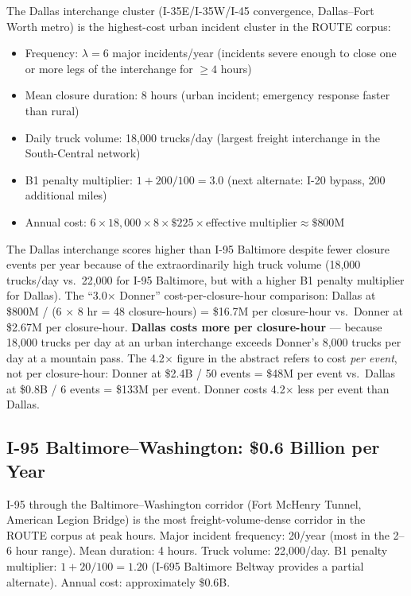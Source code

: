 The Dallas interchange cluster (I-35E/I-35W/I-45 convergence, Dallas--Fort Worth metro)
is the highest-cost urban incident cluster in the ROUTE corpus:
\begin{itemize}
\item Frequency: $\lambda = 6$ major incidents/year (incidents severe enough to close
one or more legs of the interchange for $\geq 4$ hours)
\item Mean closure duration: 8 hours (urban incident; emergency response faster than
rural)
\item Daily truck volume: 18,000 trucks/day (largest freight interchange in the
South-Central network)
\item B1 penalty multiplier: $1 + 200/100 = 3.0$ (next alternate: I-20 bypass, 200
additional miles)
\item Annual cost: $6 \times 18,000 \times 8 \times \$225 \times \text{effective multiplier}
\approx \$800\text{M}$
\end{itemize}

The Dallas interchange scores higher than I-95 Baltimore despite fewer closure events
per year because of the extraordinarily high truck volume (18,000 trucks/day vs.\ 22,000
for I-95 Baltimore, but with a higher B1 penalty multiplier for Dallas). The ``3.0$\times$
Donner'' cost-per-closure-hour comparison: Dallas at \$800M / (6 $\times$ 8 hr = 48
closure-hours) = \$16.7M per closure-hour vs.\ Donner at \$2.67M per closure-hour.
\textbf{Dallas costs more per closure-hour} --- because 18,000 trucks per day at an urban
interchange exceeds Donner's 8,000 trucks per day at a mountain pass. The 4.2$\times$
figure in the abstract refers to cost \textit{per event}, not per closure-hour: Donner
at \$2.4B / 50 events = \$48M per event vs.\ Dallas at \$0.8B / 6 events = \$133M per
event. Donner costs 4.2$\times$ less per event than Dallas.

\subsection{I-95 Baltimore--Washington: \$0.6 Billion per Year}

I-95 through the Baltimore--Washington corridor (Fort McHenry Tunnel, American Legion
Bridge) is the most freight-volume-dense corridor in the ROUTE corpus at peak hours.
Major incident frequency: 20/year (most in the 2--6 hour range). Mean duration: 4 hours.
Truck volume: 22,000/day. B1 penalty multiplier: $1 + 20/100 = 1.20$ (I-695 Baltimore
Beltway provides a partial alternate). Annual cost: approximately \$0.6B.

